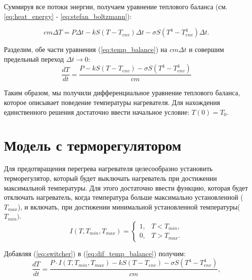 Суммируя все потоки энергии, получаем уравнение теплового баланса (см. \ref{eq:heat_energy} - \ref{eq:stefan_boltzmann}):
 
 \begin{equation}
 	cm\Delta T = P\Delta t - k S (T-T_{env})\Delta t - \sigma S (T^4 - T^4_{env})\Delta t .
 	\label{eq:temp_balance}
 \end{equation}
 
 Разделим, обе части уравнения (\ref{eq:temp_balance}) на $cm\Delta t$ и совершим предельный переход $\Delta t \rightarrow 0$:
 \begin{equation}
 	\frac{dT}{dt} = \frac{P - kS(T-T_{env}) - \sigma S (T^4 - T^4_{env})}{cm}
 	\label{eq:dif_temp_balance}
 \end{equation}
 
 Таким образом, мы получили дифференциальное уравнение теплового баланса, которое описывает поведение температуры нагревателя. 
 Для нахождения единственного решения достаточно ввести начальное условие: $T(0) = T_0$.
 \section{Модель с терморегулятором}
 
 Для предотвращения перегрева нагревателя целесообразно установить терморегулятор, который будет выключать нагреватель при достижении максимальной температуры. 
 Для этого достаточно ввести функцию, которая будет отключать нагреватель, когда температура больше максимально установленной ($T_{max}$), и включать, при достижении минимальной установленной температуры($T_{min})$.
 \begin{equation}
 	I(T, T_{min}, T_{max}) = 
 	\begin{cases}
 		1, & T < T_{min}, \\
 		0, & T > T_{max}.
 	\end{cases}
 	\label{eq:switcher}
 \end{equation}
 
 Добавляя (\ref{eq:switcher}) в (\ref{eq:dif_temp_balance}) получим:
  \begin{equation}
 	\frac{dT}{dt} = \frac{P\cdot I(T, T_{min}, T_{max}) - kS(T-T_{env}) - \sigma S (T^4 - T^4_{env})}{cm}
 	\label{eq:dif_temp_balance_with_switcher},
 \end{equation}

 
 
 
